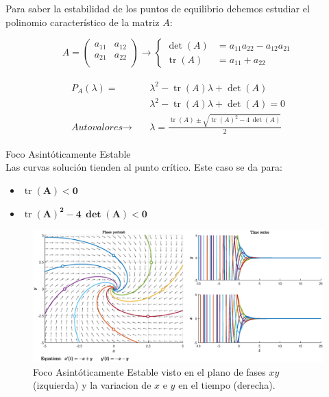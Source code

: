 \documentclass[12pt,a4paper]{report} %
\newcommand{\tr}{\operatorname{\textrm{tr}}}
\begin{document}
	\vspace{0.5cm}\noindent Para saber la estabilidad de los puntos de equilibrio debemos estudiar el polinomio característico de la matriz $A$:
	
	\begin{equation}
		\label{eq:equilibrio}
		A=\begin{pmatrix}
			a_{11} & a_{12}\\
			a_{21} & a_{22}\\
		\end{pmatrix}\rightarrow\left\{
		\begin{aligned}
		\det(A )&= a_{11}a_{22}-a_{12}a_{21} \\
		\tr(A) &= a_{11}+a_{22}
	    \end{aligned}
		\right.
	\end{equation}\smallskip
	
	\begin{eqnarray}
		\begin{aligned}
		P_A(\lambda)=&\lambda^2-\tr(A)\lambda+\det(A) \nonumber \\[1mm]
		&\lambda^2-\tr(A)\lambda+\det(A)=0 \nonumber \\[7mm]
		\textit{Autovalores}\rightarrow \quad &\lambda=\frac{\tr(A)\pm \sqrt{\tr(A)^2-4\,\det(A)}}{2}
	    \end{aligned}
	\end{eqnarray}

	\newpage

	{\Large\textbullet\quad Foco Asintóticamente Estable}\\[0.5cm]
	
	Las curvas solución tienden al punto crítico. Este caso se da para: 
	\begin{itemize}
		\item \textbf{$\tr$}$\bm{(A)<0}$
		\item \textbf{$\tr$}$\bm{(A)^2-4\, \det(A)<0}$
	\end{itemize}
	
	\begin{figure}[h]
		\centering
		\includegraphics[width=1\textwidth]{estable.eps}
		\caption{Foco Asintóticamente Estable visto en el plano de fases $xy$ (izquierda) y la variacion de $x$ e $y$ en el tiempo (derecha).}
		\label{fig:estable}
	\end{figure}\smallskip
	
\end{document}
